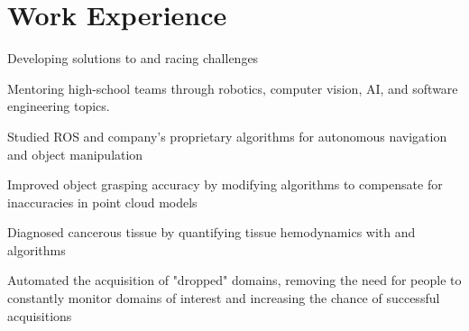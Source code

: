 \documentclass[]{deedy-resume-openfont}
\begin{document}
\begin{minipage}[t]{0.66\textwidth} 


\section{Work Experience}

\vspace{\topsep} %
\begin{tightemize}
\item Developing solutions to  and racing challenges
\item Mentoring high-school teams through robotics, computer vision, AI, and software engineering topics.
\end{tightemize}
\sectionsep

\begin{tightemize}
\item Studied ROS and company’s proprietary  algorithms for autonomous navigation and object manipulation
\item Improved object grasping accuracy by modifying algorithms to compensate for inaccuracies in point cloud models
\end{tightemize}
\sectionsep

\begin{tightemize}
\item Diagnosed cancerous tissue by quantifying tissue hemodynamics with  and  algorithms
\end{tightemize}
\sectionsep

\begin{tightemize}
\item Automated the acquisition of "dropped" domains, removing the need for people to constantly monitor domains of interest and increasing the chance of successful acquisitions
\end{tightemize}
\sectionsep


\end{minipage}
\end{document}
